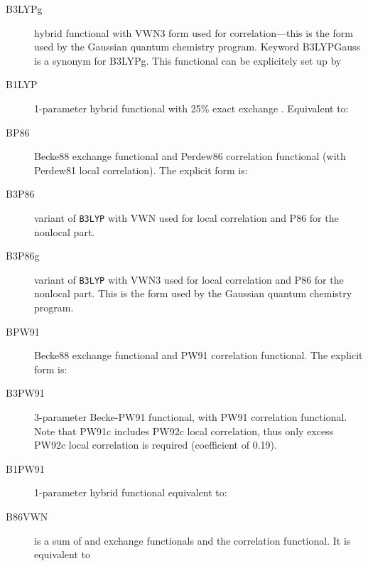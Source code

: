\begin{description}
\item[B3LYPg] hybrid functional with VWN3 form used for
  correlation---this is the form used by the Gaussian quantum chemistry
  program. Keyword B3LYPGauss is a synonym for B3LYPg. 
  This functional can be explicitely set up by

\item[B1LYP] 1-parameter hybrid functional with 25\% exact exchange \cite{dft:b1lyp}. 
  Equivalent to: 

\item[BP86] Becke88 exchange functional and Perdew86 correlation
  functional (with Perdew81 local correlation). The explicit form is:

\item[B3P86] variant of \verb|B3LYP| with VWN used for local
  correlation  and P86 for the nonlocal part.

\item[B3P86g] variant of \verb|B3LYP| with VWN3 used for local
  correlation and P86 for the nonlocal part.
  This is the form used by the Gaussian quantum chemistry program.

\item[BPW91] Becke88 exchange functional and PW91 correlation
  functional. The explicit form is:

\item[B3PW91] 3-parameter Becke-PW91 functional, with PW91 correlation 
  functional. Note that PW91c includes PW92c local correlation, thus only
  excess PW92c local correlation is required (coefficient of 0.19).

\item[B1PW91] 1-parameter hybrid functional \cite{dft:b1lyp} equivalent to:

\item[B86VWN] is a sum of  and  exchange functionals and 
  the  correlation functional. It is equivalent to 


\end{description}

